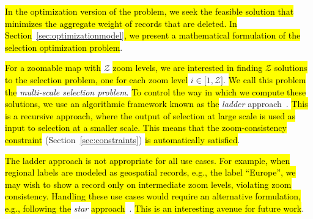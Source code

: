 \hl{In the optimization version of the problem, we seek the feasible solution that minimizes the aggregate weight of records that are deleted. In Section}~\ref{sec:optimizationmodel}\hl{, we present a mathematical formulation of the selection optimization problem}.

\hl{For a zoomable map with }$\mathcal{Z}$\hl{ zoom levels, we are interested in finding $\mathcal{Z}$ solutions to the selection problem, one for each zoom level }$i \in \lbrack 1, \mathcal{Z} \rbrack$. \hl{We call this problem the }\emph{multi-scale selection problem}. \hl{To control the way in which we compute these solutions, we use an algorithmic framework known as the }\emph{ladder} approach~\cite{foerster2010challenges}. \hl{This is a recursive approach, where the output of selection at large scale is used as input to selection at a smaller scale. This means that the zoom-consistency constraint }(Section~\ref{sec:constraints})\hl{ is automatically satisfied}.

\hl{The ladder approach is not appropriate for all use cases. For example, when regional labels are modeled as geospatial records, e.g., the label ``Europe'', we may wish to show a record only on intermediate zoom levels, violating zoom consistency. Handling these use cases would require an alternative formulation, e.g., following the }\emph{star} \hl{approach}~\cite{foerster2010challenges}. \hl{This is an interesting avenue for future work}.  




